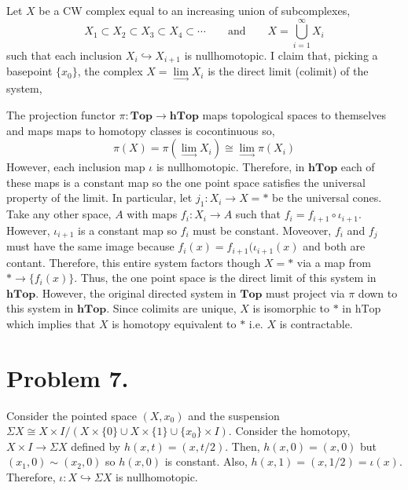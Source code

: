 \documentclass[12pt]{extarticle}
\begin{document}
Let $X$ be a CW complex equal to an increasing union of subcomplexes, 
\[ X_1 \subset X_2 \subset X_3 \subset X_4 \subset \cdots \quad \quad \text{and} \quad \quad X = \bigcup_{i = 1}^\infty X_i \]
such that each inclusion $X_i \hookrightarrow X_{i+1}$ is nullhomotopic. I claim that, picking a basepoint $\{x_0\}$, the complex $X = \lim\limits_{\rightarrow} X_i$ is the direct limit (colimit) of the system,
\begin{center}
\end{center} 
The projection functor $\pi : \mathbf{Top} \to \mathbf{hTop}$ maps topological spaces to themselves and maps maps to homotopy classes is cocontinuous so,  
\[\pi(X) = \pi(\lim\limits_{\rightarrow} X_i) \cong \lim\limits_{\rightarrow} \pi(X_i)\]
However, each inclusion map $\iota$ is nullhomotopic. Therefore, in $\mathbf{hTop}$ each of these maps is a constant map so the one point space satisfies the universal property of the limit. In particular, let $j_1 : X_i \to X = *$ be the universal cones. Take any other space, $A$ with maps $f_i : X_i \to A$ such that $f_{i} = f_{i + 1} \circ \iota_{i + 1}$. However, $\iota_{i + 1}$ is a constant map so $f_{i}$ must be constant. Moveover, $f_{i}$ and $f_{j}$ must have the same image because  $f_{i}(x) = f_{i + 1}(\iota_{i + 1}(x)$ and both are contant. Therefore, this entire system factors though $X = *$ via a map from $* \to \{f_{i}(x)\}$. Thus, the one point space is the direct limit of this system in $\mathbf{hTop}$. However, the original directed system in $\mathbf{Top}$ must project via $\pi$ down to this system in $\mathbf{hTop}$. Since colimits are unique, $X$ is isomorphic to $*$ in $\mathrm{hTop}$ which implies that $X$ is homotopy equivalent to $*$ i.e. $X$ is contractable.     

\section*{Problem 7.}

Consider the pointed space $(X, x_0)$ and the suspension $\Sigma X \cong X \times I / (X \times \{0\} \cup X \times \{1\} \cup \{x_0\} \times I) $. Consider the homotopy, $X \times I \to \Sigma X$ defined by $h(x, t) = (x, t/2)$. Then, $h(x, 0) = (x, 0)$ but $(x_1, 0) \sim (x_2, 0)$ so $h(x, 0)$ is constant. Also, $h(x, 1) = (x, 1/2) = \iota(x)$. Therefore, $\iota : X \hookrightarrow \Sigma X$ is nullhomotopic. 
\end{document}

